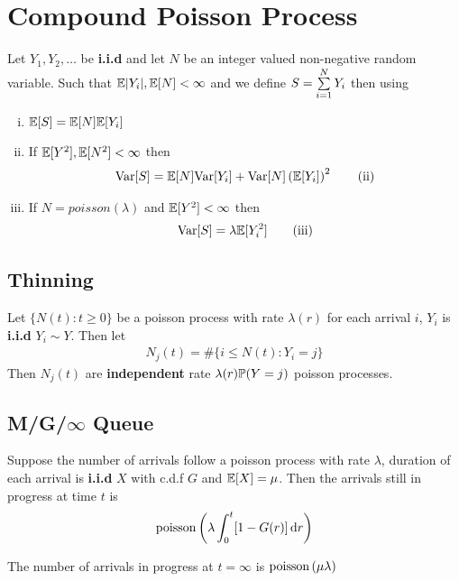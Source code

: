 \documentclass[12pt,a4paper]{article}
\begin{document}
\section{Compound Poisson Process}
\begin{thm}
Let $Y_1, Y_2, \ldots$ be \textbf{i.i.d} and let $N$ be an integer valued non-negative random variable. Such that $\E|Y_i|, \E[N] < \infty$ and we define $S = \nsum{i=1}{N}Y_i$ then using 
\begin{enumerate}[(i)]
\item $\E[S] = \E[N]\E[Y_i]$
\item If $\E[Y^2], \E[N^2] < \infty$ then 
\begin{align*}
\Var[S] = \E[N]\Var[Y_i] + \Var[N]\left(\E[Y_i]\right)^2 \tag{ii}
\end{align*}
\item If $N = poisson(\lambda)$ and $\E[Y^2]<\infty$ then 
\begin{align*}
\Var[S] = \lambda\E[Y_i^2] \tag{iii}
\end{align*}
\end{enumerate} 
\end{thm}
\subsection{Thinning}
\begin{thm}[Thinning]
Let $\{N(t) : t\geq 0\}$ be a poisson process with rate $\lambda(r)$ for each arrival $i$, $Y_i$ is \textbf{i.i.d} $Y_i \sim Y$. Then let 
\begin{align*}
N_j(t) = \#\{i \leq N(t) : Y_i = j\}
\end{align*}
Then $N_j(t)$ are \textbf{independent} rate $\lambda(r) \P(Y = j)$ poisson processes. 
\end{thm}
\newpage
\subsection{M/G/$\infty$ Queue}
\begin{thm}[M/G/$\infty$]
Suppose the number of arrivals follow a poisson process with rate $\lambda$, duration of each arrival is \textbf{i.i.d} $X$ with c.d.f $G$ and $\E[X] = \mu$. Then the arrivals still in progress at time $t$ is 
\begin{align*}
\poisson\left(\lambda \int_0^t[1-G(r)]\dd{r}\right)
\end{align*}
\end{thm}
\begin{cor}[$\infty$]
The number of arrivals in progress at $t=\infty$ is $\poisson\left(\mu\lambda\right)$ 
\end{cor}
\end{document}
